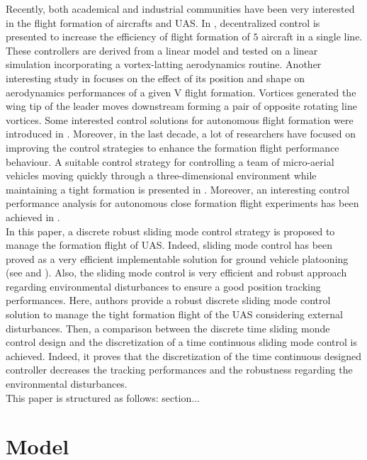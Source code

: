 \documentclass{ifacconf}
\begin{document}
Recently, both academical and industrial communities have been very interested in the flight formation of aircrafts and UAS. In \cite{wolfe1996decentralized}, decentralized control is presented to increase the efficiency of flight formation of $5$ aircraft in a single line. These controllers are derived from a linear model and tested on a linear simulation incorporating a vortex-latting aerodynamics routine. Another interesting study in \cite{thien2008effects} focuses on the effect of its position and shape on aerodynamics performances of a given V flight formation. Vortices generated the wing tip of the leader moves downstream forming a pair of opposite rotating line vortices. Some interested control solutions for autonomous flight formation were introduced in \cite{giulietti2000autonomous}. Moreover, in the last decade, a lot of researchers have focused on improving the control strategies to enhance the formation flight performance behaviour. A suitable control strategy for  controlling a team of micro-aerial vehicles moving quickly through a three-dimensional environment while maintaining a tight formation is presented in \cite{turpin2012trajectory}. Moreover, an interesting control performance analysis for autonomous close formation flight experiments has been achieved in \cite{rice2014control}.\\
In this paper, a discrete robust sliding mode control strategy is proposed to manage the formation flight of UAS. Indeed, sliding mode control has been proved as a very efficient implementable solution for ground vehicle platooning (see \cite{ferrara2008sliding} and \cite{zou2013distributed}). Also, the sliding mode control is very efficient and robust approach regarding environmental disturbances to ensure a good position tracking performances. Here, authors provide a robust discrete sliding mode control solution to manage the tight formation flight of the UAS considering external disturbances. Then, a comparison between the discrete time sliding monde control design and the discretization of a time continuous sliding mode control is achieved. Indeed, it proves that the discretization of the time continuous designed controller decreases the tracking performances and the robustness regarding the environmental disturbances.\\
This paper is structured as follows: section...


\section{Model}
\end{document}
